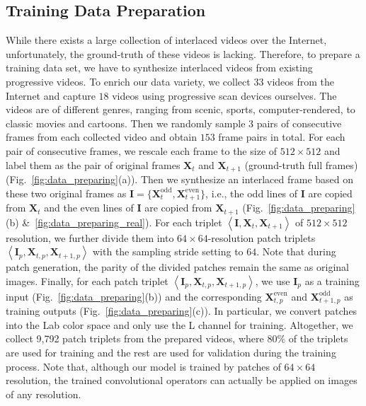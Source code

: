 \subsection{Training Data Preparation}

While there exists a large collection of interlaced videos over the Internet,
unfortunately, the ground-truth of these videos is lacking. Therefore, to
prepare a training data set, we have to synthesize
interlaced videos from existing progressive videos. To enrich our data variety, we
collect $33$ videos from the Internet and capture $18$ videos using progressive
scan devices ourselves. The videos are of different genres, ranging from 
scenic, sports, computer-rendered, to classic movies and cartoons. Then we randomly sample $3$ pairs of consecutive frames from each collected
video and obtain $153$ frame pairs in total. For each pair of consecutive
frames, we rescale each frame to the size of $512\times512$ and label them as the
pair of original frames $\mathbf{X}_t$ and $\mathbf{X}_{t+1}$ (ground-truth full frames)
(Fig.~\ref{fig:data_preparing}(a)). Then we synthesize an interlaced frame based
on these two original frames as
$\mathbf{I}=\{\mathbf{X}^{\text{odd}}_t,\mathbf{X}^{\text{even}}_{t+1}\}$, i.e.,
the odd lines of $\mathbf{I}$ are copied from $\mathbf{X}_t$ and the even lines
of $\mathbf{I}$ are copied from $\mathbf{X}_{t+1}$
(Fig.~\ref{fig:data_preparing}(b) \&~\ref{fig:data_preparing_real}). For
each triplet $\left\langle \mathbf{I}, \mathbf{X}_t,
\mathbf{X}_{t+1}\right\rangle $ of $512\times512$ resolution, we further divide
them into $64\times64$-resolution patch triplets $\left\langle \mathbf{I}_{p},
\mathbf{X}_{t,p}, \mathbf{X}_{t+1,p}\right\rangle$ with the sampling stride
setting to $64$.  Note that during patch generation, the parity of the divided
patches remain the same as original images. Finally, for each patch triplet
$\left\langle \mathbf{I}_{p}, \mathbf{X}_{t,p}, \mathbf{X}_{t+1,p}\right\rangle
$, we use $\mathbf{I}_{p}$ as a training input
(Fig.~\ref{fig:data_preparing}(b)) and the corresponding
$\mathbf{X}^{\text{even}}_{t,p}$ and $\mathbf{X}^{\text{odd}}_{t+1,p}$ as
training outputs (Fig.~\ref{fig:data_preparing}(c)). In particular, we convert
patches into the Lab color space and only use the L channel for training. Altogether, we
collect 9,792 patch triplets from the prepared videos, where $80\%$ of
the triplets are used for training and the rest are used for validation during
the training process. Note that, although our model is trained by patches of
$64\times64$ resolution, the trained convolutional operators can actually be
applied on images of any resolution.

